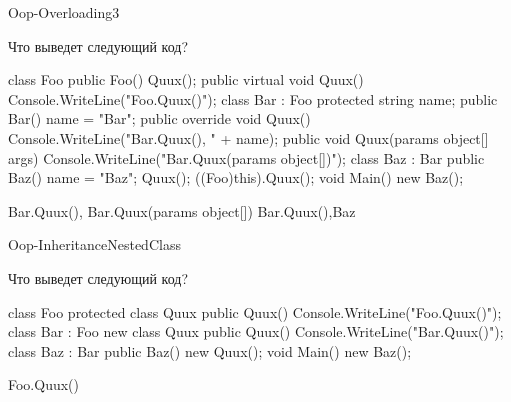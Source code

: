 \begin{defproblem}{Oop-Overloading3}
\begin{onlyproblem}
  Что выведет следующий код?
  \begin{source}
  class Foo
  {
    public Foo()
    {
      Quux();
    }
    public virtual void Quux()
    {
      Console.WriteLine("Foo.Quux()");
    }
  }
  class Bar : Foo
  {
    protected string name;
    public Bar()
    {
      name = "Bar";
    }
    public override void Quux()
    {
      Console.WriteLine("Bar.Quux(),  " + name);
    }
    public void Quux(params object[] args)
    {
      Console.WriteLine("Bar.Quux(params object[])");
    }
  }
  class Baz : Bar
  {
    public Baz()
    {
      name = "Baz";
      Quux();
    ((Foo)this).Quux();
    }  
  }
  void Main() 
  {
    new Baz();
  }
  \end{source}
\end{onlyproblem}
\begin{onlysolution}
  \begin{source}
  Bar.Quux(),
  Bar.Quux(params object[])
  Bar.Quux(),Baz
  \end{source}
\end{onlysolution}
\end{defproblem}
\begin{defproblem}{Oop-InheritanceNestedClass}
\begin{onlyproblem}
  Что выведет следующий код?
  \begin{source}
  class Foo
  {
    protected class Quux
    {
      public Quux()
      {
        Console.WriteLine("Foo.Quux()");
      }
    }
  }
  class Bar : Foo
  {
    new class Quux
    {
      public Quux()
      {
        Console.WriteLine("Bar.Quux()");
      }
    }
  }
  class Baz : Bar
  {
    public Baz()
    {
      new Quux();
    }
  }
  void Main() 
  {
    new Baz();
  }
  \end{source}
\end{onlyproblem}
\begin{onlysolution}
  \begin{source}
  Foo.Quux()
  \end{source}
\end{onlysolution}
\end{defproblem}
